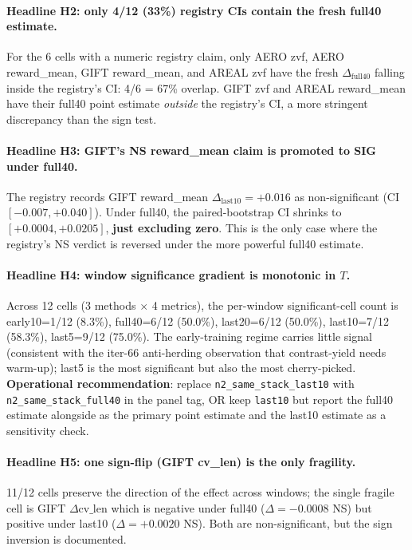 \documentclass{article}
\begin{document}
\paragraph{Headline H2: only 4/12 (33\%) registry CIs contain the fresh full40 estimate.}
For the 6 cells with a numeric registry claim, only AERO zvf, AERO
reward\_mean, GIFT reward\_mean, and AREAL zvf have the fresh
$\Delta_{\text{full40}}$ falling inside the registry's CI:
4/6 = 67\% overlap. GIFT zvf and AREAL reward\_mean have their full40
point estimate \emph{outside} the registry's CI, a more stringent
discrepancy than the sign test.

\paragraph{Headline H3: GIFT's NS reward\_mean claim is promoted to SIG under full40.}
The registry records GIFT reward\_mean
$\Delta_{\text{last10}}=+0.016$ as non-significant (CI $[-0.007,
+0.040]$). Under full40, the paired-bootstrap CI shrinks to
$[+0.0004, +0.0205]$, \textbf{just excluding zero}. This is the only
case where the registry's NS verdict is reversed under the more
powerful full40 estimate.

\paragraph{Headline H4: window significance gradient is monotonic in $T$.}
Across 12 cells (3 methods $\times$ 4 metrics), the per-window
significant-cell count is early10=1/12 (8.3\%), full40=6/12 (50.0\%),
last20=6/12 (50.0\%), last10=7/12 (58.3\%), last5=9/12 (75.0\%).
The early-training regime carries little signal (consistent with the
iter-66 anti-herding observation that contrast-yield needs warm-up);
last5 is the most significant but also the most cherry-picked.
\textbf{Operational recommendation}: replace \texttt{n2\_same\_stack\_last10}
with \texttt{n2\_same\_stack\_full40} in the panel tag, OR keep
\texttt{last10} but report the full40 estimate alongside as the
primary point estimate and the last10 estimate as a sensitivity
check.

\paragraph{Headline H5: one sign-flip (GIFT cv\_len) is the only fragility.}
11/12 cells preserve the direction of the effect across windows; the
single fragile cell is GIFT $\Delta\text{cv\_len}$ which is negative
under full40 ($\Delta=-0.0008$ NS) but positive under last10
($\Delta=+0.0020$ NS). Both are non-significant, but the sign
inversion is documented.
\end{document}
